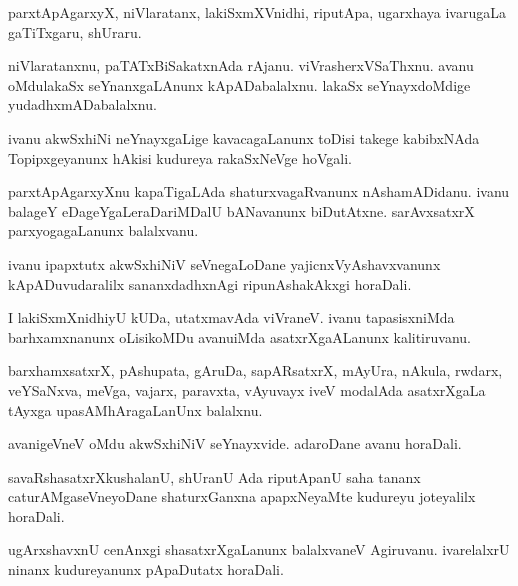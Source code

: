 \documentclass{article}
\begin{document}
\begin{mn}%
parxtApAgarxyX, niVlaratanx, lakiSxmXVnidhi, riputApa, ugarxhaya ivarugaLa gaTiTxgaru, 
shUraru.
\end{mn}

\begin{mn}%
niVlaratanxnu, paTATxBiSakatxnAda rAjanu. viVrasherxVSaThxnu. avanu oMdulakaSx 
seYnanxgaLAnunx kApADabalalxnu. lakaSx seYnayxdoMdige yudadhxmADabalalxnu.
\end{mn}

\begin{mn}%
ivanu akwSxhiNi neYnayxgaLige kavacagaLanunx toDisi takege kabibxNAda Topipxgeyanunx 
hAkisi kudureya rakaSxNeVge hoVgali.
\end{mn}

\begin{mn}%
parxtApAgarxyXnu kapaTigaLAda shaturxvagaRvanunx nAshamADidanu. ivanu balageY 
eDageYgaLeraDariMDalU bANavanunx biDutAtxne. sarAvxsatxrX parxyogagaLanunx balalxvanu.
\end{mn}

\begin{mn}%
ivanu ipapxtutx akwSxhiNiV seVnegaLoDane yajicnxVyAshavxvanunx kApADuvudaralilx 
sananxdadhxnAgi ripunAshakAkxgi horaDali.
\end{mn}

\begin{mn}%
I lakiSxmXnidhiyU kUDa, utatxmavAda viVraneV. ivanu tapasisxniMda barhxamxnanunx 
oLisikoMDu avanuiMda asatxrXgaALanunx kalitiruvanu.
\end{mn}

\begin{mn}%
barxhamxsatxrX, pAshupata, gAruDa, sapARsatxrX, mAyUra, nAkula, rwdarx, veYSaNxva, meVga, 
vajarx, paravxta, vAyuvayx iveV modalAda asatxrXgaLa tAyxga upasAMhAragaLanUnx balalxnu.
\end{mn}

\begin{mn}%
avanigeVneV oMdu akwSxhiNiV seYnayxvide. adaroDane avanu horaDali.
\end{mn}

\begin{mn}%
savaRshasatxrXkushalanU, shUranU Ada riputApanU saha tananx caturAMgaseVneyoDane 
shaturxGanxna apapxNeyaMte kudureyu joteyalilx horaDali.
\end{mn}

\begin{mn}%
ugArxshavxnU cenAnxgi shasatxrXgaLanunx balalxvaneV Agiruvanu. ivarelalxrU ninanx 
kudureyanunx pApaDutatx horaDali.
\end{mn}
\end{document}
